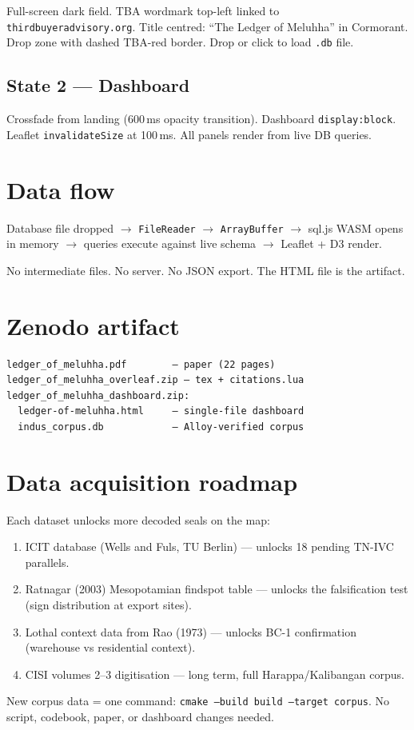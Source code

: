 \documentclass[11pt]{article}
\begin{document}
Full-screen dark field. TBA wordmark top-left linked to
\texttt{thirdbuyeradvisory.org}. Title centred: ``The Ledger
of Meluhha'' in Cormorant. Drop zone with dashed TBA-red
border. Drop or click to load \texttt{.db} file.

\subsection{State 2 --- Dashboard}

Crossfade from landing (600\,ms opacity transition).
Dashboard \texttt{display:block}. Leaflet \texttt{invalidateSize}
at 100\,ms. All panels render from live DB queries.

\section{Data flow}

Database file dropped $\to$ \texttt{FileReader} $\to$
\texttt{ArrayBuffer} $\to$ sql.js WASM opens in memory $\to$
queries execute against live schema $\to$ Leaflet + D3 render.

No intermediate files. No server. No JSON export.
The HTML file is the artifact.

\section{Zenodo artifact}

\begin{Verbatim}[fontsize=\small,frame=single]
ledger_of_meluhha.pdf        — paper (22 pages)
ledger_of_meluhha_overleaf.zip — tex + citations.lua
ledger_of_meluhha_dashboard.zip:
  ledger-of-meluhha.html     — single-file dashboard
  indus_corpus.db            — Alloy-verified corpus
\end{Verbatim}

\section{Data acquisition roadmap}

Each dataset unlocks more decoded seals on the map:

\begin{enumerate}[nosep]
\item ICIT database (Wells and Fuls, TU Berlin) --- unlocks
  18 pending TN-IVC parallels.
\item Ratnagar (2003) Mesopotamian findspot table --- unlocks
  the falsification test (sign distribution at export sites).
\item Lothal context data from Rao (1973) --- unlocks BC-1
  confirmation (warehouse vs residential context).
\item CISI volumes 2--3 digitisation --- long term, full
  Harappa/Kalibangan corpus.
\end{enumerate}

New corpus data = one command:
\texttt{cmake --build build --target corpus}.
No script, codebook, paper, or dashboard changes needed.
\end{document}
